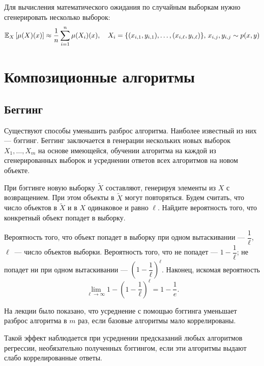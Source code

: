 \documentclass[12pt,fleqn]{article}
\begin{document}
Для вычисления математического ожидания по случайным выборкам нужно сгенерировать несколько выборок: 
$$
    \mathbb{E}_{X}\left[\mu(X)(x)\right]
    \approx
    \dfrac{1}{n}\sum_{i=1}^n\mu(X_i)(x),
    \quad
    X_i=\{(x_{i, 1}, y_{i, 1}), \dots, (x_{i, \ell}, y_{i, \ell})\}, \, x_{i,j}, y_{i, j} \sim p(x, y)
$$

\section{Композиционные алгоритмы}
\subsection{Беггинг}
Существуют способы уменьшить разброс алгоритма.
Наиболее известный из них --- бэггинг.
Беггинг заключается в генерации нескольких новых выборок $X_1, \dots, X_m$ на основе имеющейся, обучении алгоритма на каждой из сгенерированных выборок и усреднении ответов всех алгоритмов на новом объекте.

\begin{vkProblem}
    При бэггинге новую выборку $\widetilde X$ составляют, генерируя элементы из $X$ с возвращением.
    При этом объекты в $\widetilde X$ могут повторяться.
    Будем считать, что число объектов в $\widetilde X$ и в $X$ одинаковое и равно $\ell$.
    Найдите вероятность того, что конкретный объект попадет в выборку.
    \end{vkProblem}%
    \begin{esSolution}
        Вероятность того, что объект попадет в выборку при одном вытаскивании --- $\dfrac 1 \ell$, $\ell$~--- число объектов выборки.
        Вероятность того, что не попадет --- $1 - \dfrac 1 \ell$; не попадет ни при одном вытаскивании ---
        $ ( 1 - \dfrac 1 \ell )^\ell$.
        Наконец, искомая вероятность
        $$
        \lim_{\ell \rightarrow \infty} 1 -  \left( 1 - \dfrac 1 \ell \right)^\ell
        =
        1 - \dfrac{1}{e}.
        $$
    \end{esSolution}
    
    На лекции было показано, что усреднение с помощью бэггинга уменьшает разброс алгоритма в $m$ раз, если базовые алгоритмы мало коррелированы. 
    
    Такой эффект наблюдается при усреднении предсказаний любых алгоритмов регрессии, необязательно полученных бэггингом, если эти алгоритмы выдают слабо коррелированные ответы.
    
\end{document}
